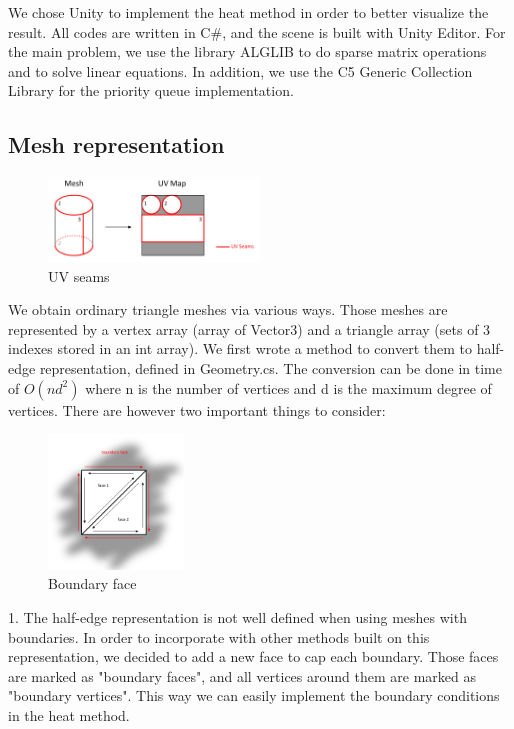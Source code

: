 \documentclass[a4paper,12pt,twoside]{article}
\begin{document}
We chose Unity to implement the heat method in order to better visualize the result. All codes are written in C\#, and the scene is built with Unity Editor. For the main problem, we use the library ALGLIB to do sparse matrix operations and to solve linear equations. In addition, we use the C5 Generic Collection Library for the priority queue implementation.


\subsection{Mesh representation}

\begin{figure}
	\centering
	\includegraphics[width=0.5\textwidth]{F1.png}
	\caption{UV seams}
\end{figure}

We obtain ordinary triangle meshes via various ways. Those meshes are represented by a vertex array (array of Vector3) and a triangle array (sets of 3 indexes stored in an int array). We first wrote a method to convert them to half-edge representation, defined in Geometry.cs. The conversion can be done in time of $O(nd^2)$ where n is the number of vertices and d is the maximum degree of vertices. There are however two important things to consider:

\begin{figure}
	\centering
	\includegraphics[width=0.32\textwidth]{F2.png}
	\caption{Boundary face}
\end{figure}

1. The half-edge representation is not well defined when using meshes with boundaries. In order to incorporate with other methods built on this representation, we decided to add a new face to cap each boundary. Those faces are marked as "boundary faces", and all vertices around them are marked as "boundary vertices". This way we can easily implement the boundary conditions in the heat method.
\end{document}

